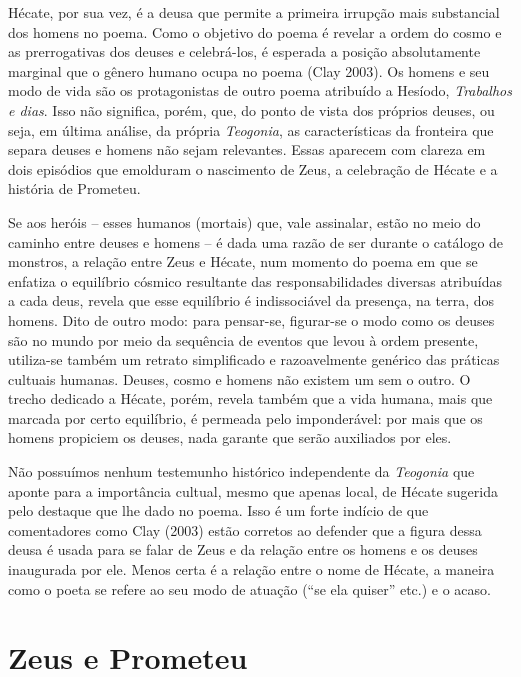 Hécate, por sua vez, é a deusa que permite a primeira irrupção mais
substancial dos homens no poema. Como o objetivo do poema é revelar a
ordem do cosmo e as prerrogativas dos deuses e celebrá-los, é esperada a
posição absolutamente marginal que o gênero humano ocupa no poema (Clay
2003). Os homens e seu modo de vida são os protagonistas de outro poema
atribuído a Hesíodo, \emph{Trabalhos e dias}. Isso não significa, porém,
que, do ponto de vista dos próprios deuses, ou seja, em última análise,
da própria \emph{Teogonia}, as características da fronteira que separa
deuses e homens não sejam relevantes. Essas aparecem com clareza em dois
episódios que emolduram o nascimento de Zeus, a celebração de Hécate e a
história de Prometeu.

Se aos heróis -- esses humanos (mortais) que, vale assinalar, estão no
meio do caminho entre deuses e homens -- é dada uma razão de ser durante
o catálogo de monstros, a relação entre Zeus e Hécate, num momento do
poema em que se enfatiza o equilíbrio cósmico resultante das
responsabilidades diversas atribuídas a cada deus, revela que esse
equilíbrio é indissociável da presença, na terra, dos homens. Dito de
outro modo: para pensar-se, figurar-se o modo como os deuses são no
mundo por meio da sequência de eventos que levou à ordem presente,
utiliza-se também um retrato simplificado e razoavelmente genérico das
práticas cultuais humanas. Deuses, cosmo e homens não existem um sem o
outro. O trecho dedicado a Hécate, porém, revela também que a vida
humana, mais que marcada por certo equilíbrio, é permeada pelo
imponderável: por mais que os homens propiciem os deuses, nada garante
que serão auxiliados por eles.

Não possuímos nenhum testemunho histórico independente da
\emph{Teogonia} que aponte para a importância cultual, mesmo que apenas
local, de Hécate sugerida pelo destaque que lhe dado no poema. Isso é um
forte indício de que comentadores como Clay (2003) estão corretos ao
defender que a figura dessa deusa é usada para se falar de Zeus e da
relação entre os homens e os deuses inaugurada por ele. Menos certa é a
relação entre o nome de Hécate, a maneira como o poeta se refere ao seu
modo de atuação (``se ela quiser'' etc.) e o acaso.

\section{Zeus e Prometeu}

